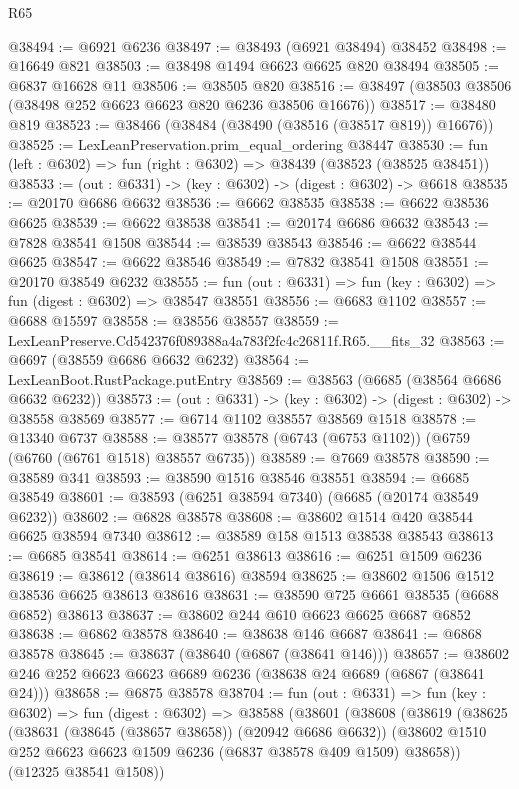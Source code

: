 \begin{lexlean}{R65}
\begin{coremodule}
{@38494 := @6921 @6236
@38497 := @38493 (@6921 @38494) @38452
@38498 := @16649 @821
@38503 := @38498 @1494 @6623 @6625 @820 @38494
@38505 := @6837 @16628 @11
@38506 := @38505 @820
@38516 := @38497 (@38503 @38506 (@38498 @252 @6623 @6623 @820 @6236 @38506 @16676))
@38517 := @38480 @819
@38523 := @38466 (@38484 (@38490 (@38516 (@38517 @819)) @16676))
@38525 := LexLeanPreservation.prim_equal_ordering @38447
@38530 := fun (left : @6302) => fun (right : @6302) => @38439 (@38523 (@38525 @38451))
@38533 := (out : @6331) -> (key : @6302) -> (digest : @6302) -> @6618
@38535 := @20170 @6686 @6632
@38536 := @6662 @38535
@38538 := @6622 @38536 @6625
@38539 := @6622 @38538
@38541 := @20174 @6686 @6632
@38543 := @7828 @38541 @1508
@38544 := @38539 @38543
@38546 := @6622 @38544 @6625
@38547 := @6622 @38546
@38549 := @7832 @38541 @1508
@38551 := @20170 @38549 @6232
@38555 := fun (out : @6331) => fun (key : @6302) => fun (digest : @6302) => @38547 @38551
@38556 := @6683 @1102
@38557 := @6688 @15597
@38558 := @38556 @38557
@38559 := LexLeanPreserve.Cd542376f089388a4a783f2fc4c26811f.R65.__fits_32
@38563 := @6697 (@38559 @6686 @6632 @6232)
@38564 := LexLeanBoot.RustPackage.putEntry
@38569 := @38563 (@6685 (@38564 @6686 @6632 @6232))
@38573 := (out : @6331) -> (key : @6302) -> (digest : @6302) -> @38558 @38569
@38577 := @6714 @1102 @38557 @38569 @1518
@38578 := @13340 @6737
@38588 := @38577 @38578 (@6743 (@6753 @1102)) (@6759 (@6760 (@6761 @1518) @38557 @6735))
@38589 := @7669 @38578
@38590 := @38589 @341
@38593 := @38590 @1516 @38546 @38551
@38594 := @6685 @38549
@38601 := @38593 (@6251 @38594 @7340) (@6685 (@20174 @38549 @6232))
@38602 := @6828 @38578
@38608 := @38602 @1514 @420 @38544 @6625 @38594 @7340
@38612 := @38589 @158 @1513 @38538 @38543
@38613 := @6685 @38541
@38614 := @6251 @38613
@38616 := @6251 @1509 @6236
@38619 := @38612 (@38614 @38616) @38594
@38625 := @38602 @1506 @1512 @38536 @6625 @38613 @38616
@38631 := @38590 @725 @6661 @38535 (@6688 @6852) @38613
@38637 := @38602 @244 @610 @6623 @6625 @6687 @6852
@38638 := @6862 @38578
@38640 := @38638 @146 @6687
@38641 := @6868 @38578
@38645 := @38637 (@38640 (@6867 (@38641 @146)))
@38657 := @38602 @246 @252 @6623 @6623 @6689 @6236 (@38638 @24 @6689 (@6867 (@38641 @24)))
@38658 := @6875 @38578
@38704 := fun (out : @6331) =>
  fun (key : @6302) =>
  fun (digest : @6302) =>
  @38588
    (@38601
      (@38608
        (@38619
          (@38625
            (@38631 (@38645 (@38657 @38658)) (@20942 @6686 @6632))
            (@38602 @1510 @252 @6623 @6623 @1509 @6236 (@6837 @38578 @409 @1509) @38658))
          (@12325 @38541 @1508))
}
\end{coremodule}
\end{lexlean}
